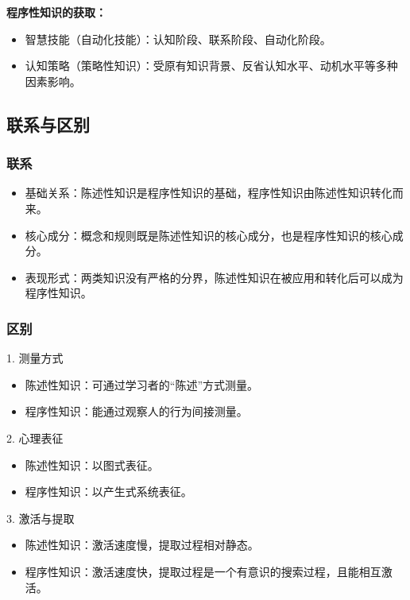 \textbf{程序性知识的获取：}
\begin{itemize}
    \item 智慧技能（自动化技能）：认知阶段、联系阶段、自动化阶段。
    \item 认知策略（策略性知识）：受原有知识背景、反省认知水平、动机水平等多种因素影响。
\end{itemize}


\subsection{联系与区别}

\subsubsection*{联系}

\begin{itemize}
    \item 基础关系：陈述性知识是程序性知识的基础，程序性知识由陈述性知识转化而来。
    \item 核心成分：概念和规则既是陈述性知识的核心成分，也是程序性知识的核心成分。
    \item 表现形式：两类知识没有严格的分界，陈述性知识在被应用和转化后可以成为程序性知识。
\end{itemize}

\subsubsection*{区别}

1. 测量方式
\begin{itemize}
    \item 陈述性知识：可通过学习者的“陈述”方式测量。
    \item 程序性知识：能通过观察人的行为间接测量。
\end{itemize}

2. 心理表征
\begin{itemize}
    \item 陈述性知识：以图式表征。
    \item 程序性知识：以产生式系统表征。
\end{itemize}

3. 激活与提取
\begin{itemize}
    \item 陈述性知识：激活速度慢，提取过程相对静态。
    \item 程序性知识：激活速度快，提取过程是一个有意识的搜索过程，且能相互激活。
\end{itemize}

